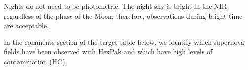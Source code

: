 \documentclass[11pt]{article}
\begin{document}
Nights do not need to be photometric. 
The night sky is bright in the NIR regardless of the phase of the Moon; therefore, observations during bright time are acceptable. 

In the comments section of the target table below, we identify which supernova fields have been observed with HexPak and which have high levels of contamination (HC).

%
%

\begin{configuration}
\grating{}
\order{}
\crossdisperser{}       
\slit{}
\multislit{}            
\wstart{}
\wend{}
\cable{}
\corrector{}            
\collimator{}             
\adc{}
\end{configuration}



%
%

\end{document}
